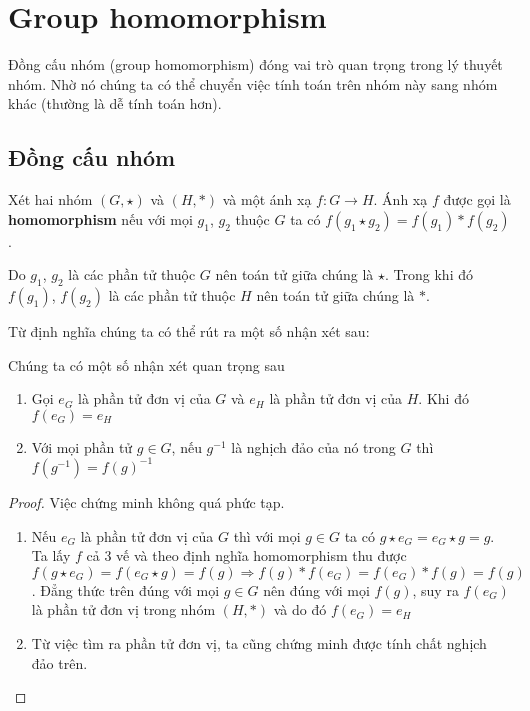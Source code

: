 \chapter{Group homomorphism}

Đồng cấu nhóm (group homomorphism) đóng vai trò quan trọng trong lý thuyết nhóm.
Nhờ nó chúng ta có thể chuyển việc tính toán trên nhóm này sang nhóm khác (thường
là dễ tính toán hơn).

\section{Đồng cấu nhóm}

\begin{definition}[Homomorphism]
    Xét hai nhóm $(G, \star)$ và $(H, *)$ và một ánh xạ $f: G \to H$.
    Ánh xạ $f$ được gọi là \textbf{homomorphism} nếu với mọi $g_1$, $g_2$ thuộc
    $G$ ta có $f(g_1 \star g_2) = f(g_1) * f(g_2)$.
\end{definition}

Do $g_1$, $g_2$ là các phần tử thuộc $G$ nên toán tử giữa chúng là $\star$. Trong
khi đó $f(g_1)$, $f(g_2)$ là các phần tử thuộc $H$ nên toán tử giữa chúng là $*$.

Từ định nghĩa chúng ta có thể rút ra một số nhận xét sau:

\begin{remark} Chúng ta có một số nhận xét quan trọng sau
    \begin{enumerate}
        \item Gọi $e_G$ là phần tử đơn vị của $G$ và $e_H$ là phần tử đơn
        vị của $H$. Khi đó $f(e_G) = e_H$
        \item Với mọi phần tử $g \in G$, nếu $g^{-1}$ là nghịch đảo của nó trong
        $G$ thì $f(g^{-1}) = f(g)^{-1}$
    \end{enumerate}
\end{remark}

\begin{proof}
    Việc chứng minh không quá phức tạp.
    \begin{enumerate}
        \item Nếu $e_G$ là phần tử đơn vị của $G$ thì với mọi $g \in G$ ta có
        $g \star e_G = e_G \star g = g$. Ta lấy $f$ cả 3 vế và theo định nghĩa
        homomorphism thu được
        $f(g \star e_G) = f(e_G \star g) = f(g) \Rightarrow f(g) * f(e_G) 
        = f(e_G) * f(g) = f(g)$. Đẳng thức trên đúng với mọi $g \in G$ nên đúng với
        mọi $f(g)$, suy ra $f(e_G)$ là phần tử đơn vị trong nhóm $(H, *)$ và
        do đó $f(e_G) = e_H$
        \item Từ việc tìm ra phần tử đơn vị, ta cũng chứng minh được
        tính chất nghịch đảo trên.
    \end{enumerate}
\end{proof}

